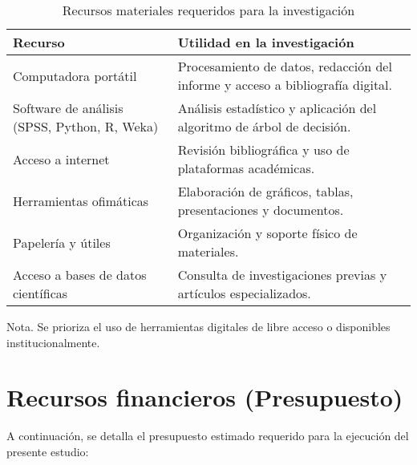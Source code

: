 \begin{table}[H]
\centering
\begin{threeparttable}
\caption{Recursos materiales requeridos para la investigación}
\label{tab:recursos_materiales}
\begin{tabular}{@{}p{6cm}p{7cm}@{}}
\toprule
\textbf{Recurso} & \textbf{Utilidad en la investigación} \\
\midrule
Computadora portátil & Procesamiento de datos, redacción del informe y acceso a bibliografía digital. \\
Software de análisis (SPSS, Python, R, Weka) & Análisis estadístico y aplicación del algoritmo de árbol de decisión. \\
Acceso a internet & Revisión bibliográfica y uso de plataformas académicas. \\
Herramientas ofimáticas & Elaboración de gráficos, tablas, presentaciones y documentos. \\
Papelería y útiles & Organización y soporte físico de materiales. \\
Acceso a bases de datos científicas & Consulta de investigaciones previas y artículos especializados. \\
\bottomrule
\end{tabular}
\begin{tablenotes}
\item Nota. Se prioriza el uso de herramientas digitales de libre acceso o disponibles institucionalmente.
\end{tablenotes}
\end{threeparttable}
\end{table}

\section{Recursos financieros (Presupuesto)}

A continuación, se detalla el presupuesto estimado requerido para la ejecución del presente estudio:

